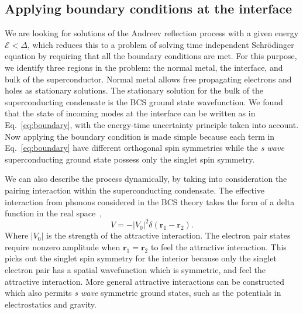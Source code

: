 \documentclass[12pt,letterpaper,aps,onecolumn,superscriptaddress,floatfix,notitlepage]{revtex4-1}
\begin{document}
	\subsection{Applying boundary conditions at the interface}
	We are looking for solutions of the Andreev reflection process with a given energy $\mathcal{E}<\Delta$, which reduces this to a problem of solving time independent Schr\"{o}dinger equation by requiring that all the boundary conditions are met. For this purpose, we identify three regions in the problem: the normal metal, the interface, and bulk of the superconductor. Normal metal allows free propagating electrons and holes as stationary solutions. The stationary solution for the bulk of the superconducting condensate is the BCS ground state wavefunction. We found that the state of incoming modes at the interface can be written as in Eq.~\eqref{eq:boundary}, with the energy-time uncertainty principle taken into account. Now applying the boundary condition is made simple because each term in Eq.~\eqref{eq:boundary} have different orthogonal spin symmetries while the \textit{s wave} superconducting ground state possess only the singlet spin symmetry.
	
	We can also describe the process dynamically, by taking into consideration the pairing interaction within the superconducting condensate. The effective interaction from phonons considered in the BCS theory takes the form of a delta function in the real space~\cite{annett2004superconductivity},
	\begin{equation}
	V = -|V_{0}|^{2}\delta(\textbf{r}_{1}-\textbf{r}_{2}).
	\end{equation}
	Where $|V_{0}|$ is the strength of the attractive interaction.	The electron pair states require nonzero amplitude when $\textbf{r}_{1}=\textbf{r}_{2}$ to feel the attractive interaction. This picks out the singlet spin symmetry for the interior because only the singlet electron pair has a spatial wavefunction which is symmetric, and feel the attractive interaction. More general attractive interactions can be constructed which also permits \textit{s wave} symmetric ground states, such as the potentials in electrostatics and gravity.
	
\end{document}
